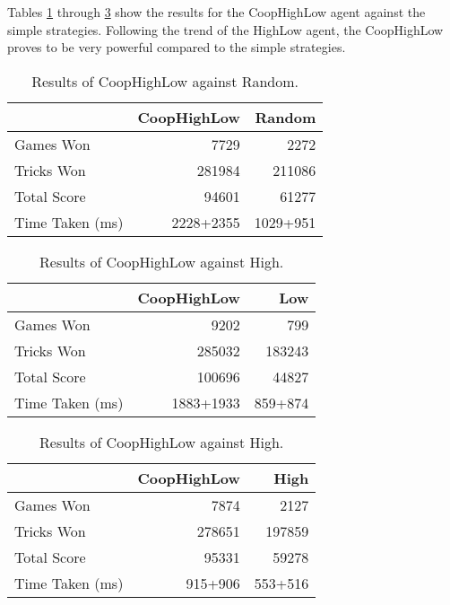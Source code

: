 Tables \ref{tab:coophighlow_random} through \ref{tab:coophighlow_high} show the results for the CoopHighLow agent against the simple
strategies. Following the trend of the HighLow agent, the CoopHighLow proves to be very powerful compared to the simple strategies.

\begin{table}[ht]
    \centering
    \begin{tabular}{l|rr}
        ~               &   CoopHighLow &   Random  \\  \hline
        Games Won       &   7729        &   2272   \\
        Tricks Won      &   281984      &   211086 \\
        Total Score     &   94601       &   61277  \\
        Time Taken (ms) &   2228+2355   &   1029+951
    \end{tabular}
    \caption{Results of CoopHighLow against Random.}
    \label{tab:coophighlow_random}
\end{table}

\begin{table}[ht]
    \begin{minipage}{.525\linewidth}
        \centering
        \begin{tabular}{l|rr}
            ~               &   CoopHighLow &   Low  \\  \hline
            Games Won       &   9202        &   799   \\
            Tricks Won      &   285032      &   183243 \\
            Total Score     &   100696      &   44827  \\
            Time Taken (ms) &   1883+1933   &   859+874
        \end{tabular}
        \caption{Results of CoopHighLow against Low.}
        \label{tab:coophighlow_low}
    \end{minipage}%
    \begin{minipage}{.525\linewidth}
        \centering
        \begin{tabular}{l|rr}
            ~               &   CoopHighLow &   High  \\  \hline
            Games Won       &   7874        &   2127   \\
            Tricks Won      &   278651      &   197859 \\
            Total Score     &   95331       &   59278  \\
            Time Taken (ms) &   915+906   &   553+516
        \end{tabular}
        \caption{Results of CoopHighLow against High.}
        \label{tab:coophighlow_high}
    \end{minipage} 
\end{table}


